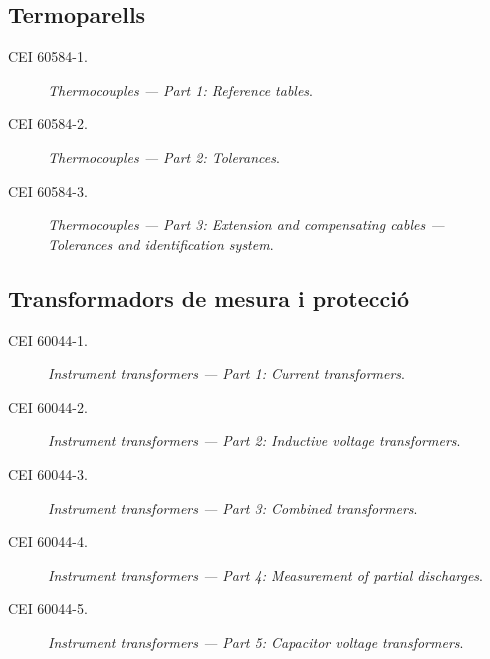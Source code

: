 \subsection*{Termoparells} 
\begin{description}
	\item [\hspace{5mm}CEI 60584-1.] \textit{Thermocouples --- Part 1: Reference tables}.
	\item [\hspace{5mm}CEI 60584-2.] \textit{Thermocouples --- Part 2: Tolerances}.
	\item [\hspace{5mm}CEI 60584-3.] \textit{Thermocouples --- Part 3: Extension and compensating cables --- Tolerances and identification system}.
\end{description}


\subsection*{Transformadors de mesura i protecció}
\begin{description}
	\item [\hspace{5mm}CEI 60044-1.] \textit{Instrument transformers --- Part 1: Current transformers}.
	\item [\hspace{5mm}CEI 60044-2.] \textit{Instrument transformers --- Part 2: Inductive voltage transformers}.
	\item [\hspace{5mm}CEI 60044-3.] \textit{Instrument transformers --- Part 3: Combined transformers}.
	\item [\hspace{5mm}CEI 60044-4.] \textit{Instrument transformers --- Part 4: Measurement of partial discharges}.
	\item [\hspace{5mm}CEI 60044-5.] \textit{Instrument transformers --- Part 5: Capacitor voltage transformers}.
\end{description}


